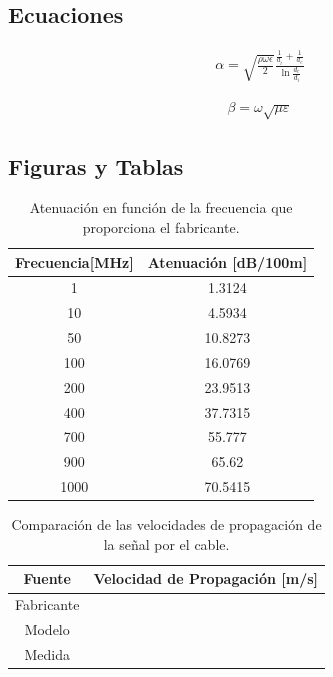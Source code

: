 \documentclass[10pt,conference,a4paper]{IEEEtran}
\begin{document}
\subsection{Ecuaciones}

\begin{eqnarray}
    \label{eq:atenuacion_coaxial}
    \alpha = \sqrt{\frac{\rho \omega \epsilon}{2}} \frac{\frac{1}{d_i} + \frac{1}{d_e}}{\ln{\frac{d_e}{d_i}}}
\end{eqnarray}

\begin{eqnarray}
    \label{eq:constante_fase_coaxial}
    \beta = \omega \sqrt{\mu \varepsilon}
\end{eqnarray}

\subsection{Figuras y Tablas}

\begin{table}[htb]
    \renewcommand{\arraystretch}{1.2}
    \centering
    \begin{tabular}{|c|c|}
	\hline
	Frecuencia[MHz] & Atenuación [dB/100m] \\
	\hline
	1 & 1.3124 \\
	10 & 4.5934 \\
	50 & 10.8273 \\	
	100 & 16.0769 \\
	200 & 23.9513 \\
	400 & 37.7315 \\
	700 & 55.777 \\
	900 & 65.62 \\
	1000 & 70.5415 \\
	\hline
    \end{tabular}
    \caption{Atenuación en función de la frecuencia que proporciona el fabricante.}
    \label{tab:atenuacion_coaxial}
\end{table}

\begin{table}[htb]
    \renewcommand{\arraystretch}{1.2}
    \centering
    \begin{tabular}{|c|c|}
	\hline
	Fuente & Velocidad de Propagación [m/s] \\
	\hline
	Fabricante &  \\
	Modelo & \\
	Medida & \\	
	\hline
    \end{tabular}
    \caption{Comparación de las velocidades de propagación de la señal por el cable.}
    \label{tab:atenuacion_coaxial}
\end{table}
\end{document}
